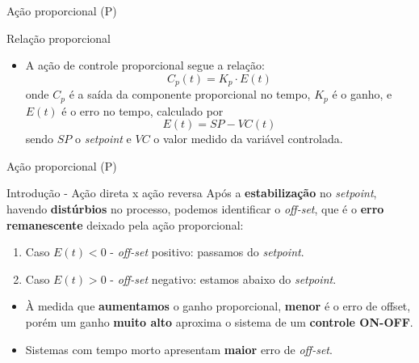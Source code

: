 \begin{frame}{Ação proporcional (P)}
	\begin{block}{Relação proporcional}
		\begin{itemize}
			\item A ação de controle proporcional segue a relação:
			\[ C_p(t) = K_p\cdot E(t) \]
			onde $ C_p $ é a saída da componente proporcional no tempo, $ K_p $ é o ganho, e $ E(t) $ é o erro no tempo, calculado por
			\[ E(t)=SP-VC(t) \]
			sendo $ SP $ o \textit{setpoint} e $ VC $ o valor medido da variável controlada.
		\end{itemize}
	\end{block}
\end{frame}


\begin{frame}{Ação proporcional (P)}
	\begin{block}{Introdução - Ação direta x ação reversa}
		Após a \textbf{estabilização} no \textit{setpoint}, havendo \textbf{distúrbios} no processo, podemos identificar o \textit{off-set}, que é o \textbf{erro remanescente} deixado pela ação proporcional:
		\begin{enumerate}
			\item Caso $ E(t)<0 $ - \textit{off-set} positivo: passamos do \textit{setpoint}.
			\item Caso $ E(t)>0 $ - \textit{off-set} negativo: estamos abaixo do \textit{setpoint}.
		\end{enumerate}
		\begin{itemize}
			\item À medida que \textbf{aumentamos} o ganho proporcional, \textbf{menor} é o erro de offset, porém um ganho \textbf{muito	alto} aproxima o sistema de um \textbf{controle ON-OFF}.
			\item Sistemas com tempo morto apresentam \textbf{maior} erro de \textit{off-set}.
		\end{itemize}
	\end{block}
\end{frame}


